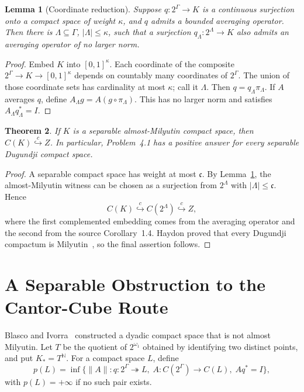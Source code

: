 \documentclass[11pt]{article}
\newtheorem{theorem}{Theorem}[section]
\newtheorem{lemma}[theorem]{Lemma}
\theoremstyle{definition}
\theoremstyle{remark}
\newcommand{\C}{C}
\newcommand{\cc}{\mathfrak c}
\newcommand{\Id}{I}
\newcommand{\hookc}{\stackrel{c}{\hookrightarrow}}
\begin{document}
\begin{lemma}[Coordinate reduction]\label{lem:coordinate}
Suppose \(q:2^\Gamma\to K\) is a continuous surjection onto a compact space
of weight \(\kappa\), and \(q\) admits a bounded averaging operator.  Then
there is \(\Lambda\subseteq\Gamma\), \(|\Lambda|\leq\kappa\), such that a
surjection \(q_\Lambda:2^\Lambda\to K\) also admits an averaging operator of
no larger norm.
\end{lemma}

\begin{proof}
Embed \(K\) into \([0,1]^\kappa\).  Each coordinate of the composite
\(2^\Gamma\to K\to[0,1]^\kappa\) depends on countably many coordinates of
\(2^\Gamma\).  The union of those coordinate sets has cardinality at most
\(\kappa\); call it \(\Lambda\).  Then \(q=q_\Lambda\pi_\Lambda\).  If
\(A\) averages \(q\), define \(A_\Lambda g=A(g\circ\pi_\Lambda)\).  This
has no larger norm and satisfies \(A_\Lambda q_\Lambda^*=\Id\).
\end{proof}

\begin{theorem}\label{thm:milyutin-positive}
If \(K\) is a separable almost-Milyutin compact space, then
\(\C(K)\hookc Z\).  In particular, Problem~4.1 has a positive
answer for every separable Dugundji compact space.
\end{theorem}

\begin{proof}
A separable compact space has weight at most \(\cc\).  By
Lemma~\ref{lem:coordinate}, the almost-Milyutin witness can be chosen as a
surjection from \(2^\Lambda\) with \(|\Lambda|\leq\cc\).  Hence
\[
       \C(K)\hookc \C(2^\Lambda)\hookc Z,
\]
where the first complemented embedding comes from the averaging operator and
the second from the source Corollary~1.4.  Haydon proved that every Dugundji
compactum is Milyutin~\cite{Haydon}, so the final assertion follows.
\end{proof}

\section{A Separable Obstruction to the Cantor-Cube Route}

Blasco and Ivorra~\cite{BlascoIvorra} constructed a dyadic compact space
that is not almost Milyutin.  Let \(T\) be the quotient of \(2^{\omega_1}\)
obtained by identifying two distinct points, and put \(K_*=T^{\mathbb N}\).
For a compact space \(L\), define
\[
 p(L)=\inf\{\|A\|:q:2^\Gamma\twoheadrightarrow L,\;
 A:\C(2^\Gamma)\to\C(L),\; Aq^*=\Id\},
\]
with \(p(L)=+\infty\) if no such pair exists.
\end{document}
